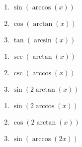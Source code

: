 \begin{multicols}{3} 

\begin{enumerate}

\setcounter{enumi}{\value{HW}}

\item $\sin \left( \arccos \left( x \right) \right)$ \label{rewritefirst}
\item $\cos \left( \arctan \left( x \right) \right)$ 
\item $\tan \left( \arcsin \left( x \right) \right)$ 

\setcounter{HW}{\value{enumi}}

\end{enumerate}

\end{multicols}

\begin{multicols}{3}

\begin{enumerate}

\setcounter{enumi}{\value{HW}}

\item $\sec \left( \arctan \left( x \right) \right)$ 
\item $\csc \left( \arccos \left( x \right) \right)$ 
\item $\sin \left( 2\arctan \left( x \right) \right)$ 

\setcounter{HW}{\value{enumi}}

\end{enumerate}

\end{multicols}

\begin{multicols}{3}

\begin{enumerate}

\setcounter{enumi}{\value{HW}}

\item $\sin \left( 2\arccos \left( x \right) \right)$ 
\item $\cos \left( 2\arctan \left( x \right) \right)$ 
\item  $\sin(\arccos(2x))$

\setcounter{HW}{\value{enumi}}

\end{enumerate}

\end{multicols}

